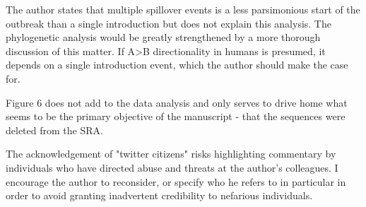 \documentclass[11pt, oneside]{article}   	%
\begin{document}
The author states that multiple spillover events is a less parsimonious start of the outbreak than a single introduction but does not explain this analysis. The phylogenetic analysis would be greatly strengthened by a more thorough discussion of this matter. If A>B directionality in humans is presumed, it depends on a single introduction event, which the author should make the case for.

Figure 6 does not add to the data analysis and only serves to drive home what seems to be the primary objective of the manuscript - that the sequences were deleted from the SRA.

The acknowledgement of "twitter citizens" risks highlighting commentary by individuals who have directed abuse and threats at the author's colleagues. I encourage the author to reconsider, or specify who he refers to in particular in order to avoid granting inadvertent credibility to nefarious individuals.

\color{black}

{\small

}
\end{document}
